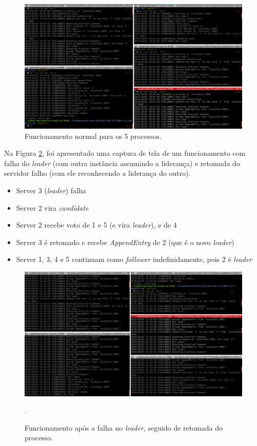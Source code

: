 \documentclass[journal,onecolumn]{IEEEtran}
\begin{document}
\begin{figure}[H]
\centering
\centerline{\includegraphics[scale=0.4]{imagens/funcionamento_normal.png}}
\caption{Funcionamento normal para os 5 processos.}
\label{funcionamento_normal}
\end{figure}

Na Figura \ref{falha_no_lider}, foi apresentado uma captura de tela de um funcionamento com falha do \textit{leader} (com outra instância assumindo a liderança) e retomada do servidor falho (com ele reconhecendo a liderança do outro).

\begin{itemize}
\item Server 3 (\textit{leader}) falha
\item Server 2 vira \textit{candidate}
\item Server 2 recebe voto de 1 e 5 (e vira \textit{leader}), e de 4
\item Server 3 é retomado e recebe \textit{AppendEntry} de 2 (que é o novo \textit{leader})
\item Server 1, 3, 4 e 5 continuam como \textit{follower} indefinidamente, pois 2 é \textit{leader}
\end{itemize}

\begin{figure}[H]
\centering
\centerline{\includegraphics[scale=0.4]{imagens/falha_no_lider.png}}
\caption{Funcionamento após a falha no \textit{leader}, seguido de retomada do processo.}.
\label{falha_no_lider}
\end{figure}
\end{document}
